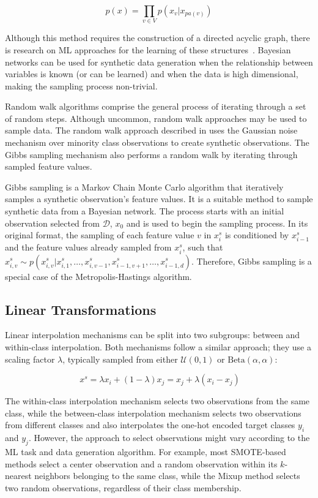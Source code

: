 \documentclass[parskip=full]{scrartcl}
\begin{document}
\begin{equation}
    p(x) = \prod_{v \in V} p(x_v | x_{pa(v)})
\end{equation}

Although this method requires the construction of a directed acyclic graph,
there is research on ML approaches for the learning of these
structures~\cite{yu2019dag}. Bayesian networks can be used for synthetic data
generation when the relationship between variables is known (or can be
learned) and when the data is high dimensional, making the sampling process
non-trivial.

Random walk algorithms comprise the general process of iterating through a set
of random steps. Although uncommon, random walk approaches may be used to
sample data. The random walk approach described in \citet{zhang2014rwo} uses
the Gaussian noise mechanism over minority class observations to create
synthetic observations. The Gibbs sampling mechanism also performs a random
walk by iterating through sampled feature values.

Gibbs sampling is a Markov Chain Monte Carlo algorithm that iteratively
samples a synthetic observation's feature values. It is a suitable method to
sample synthetic data from a Bayesian network. The process starts with an
initial observation selected from $\mathcal{D}$, $x_0$ and is used to begin
the sampling process. In its original format, the sampling of each feature
value $v$ in $x^s_i$ is conditioned by $x^s_{i-1}$ and the feature values
already sampled from $x^s_i$, such that $x^s_{i, v} \sim p(x^s_{i, v} |
x^s_{i, 1}, \ldots, x^s_{i, v-1}, x^s_{i-1, v+1}, \dots, x^s_{i-1, d})$.
Therefore, Gibbs sampling is a special case of the Metropolis-Hastings
algorithm.

\subsection{Linear Transformations}

Linear interpolation mechanisms can be split into two subgroups: between and
within-class interpolation. Both mechanisms follow a similar approach; they
use a scaling factor $\lambda$, typically sampled from either
$\mathcal{U}(0,1)$ or $\text{Beta}(\alpha, \alpha)$: 

\begin{equation}~\label{eq:interpolation}
    x^s = \lambda x_i + (1-\lambda)x_j = x_j + \lambda(x_i - x_j)
\end{equation}

The within-class interpolation mechanism selects two observations from the
same class, while the between-class interpolation mechanism selects two
observations from different classes and also interpolates the one-hot encoded
target classes $y_i$ and $y_j$. However, the approach to select observations
might vary according to the ML task and data generation algorithm. For
example, most SMOTE-based methods select a center observation and a random
observation within its $k$-nearest neighbors belonging to the same class,
while the Mixup method selects two random observations, regardless of their
class membership.
\end{document}
